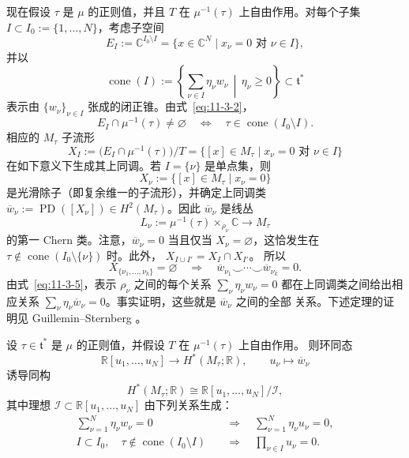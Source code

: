 现在假设 $\tau$ 是 $\mu$ 的正则值，并且 $T$ 在 $\mu^{-1}(\tau)$ 上自由作用。对每个子集
$I\subset I_0:=\{1,\ldots,N\}$，考虑子空间
\[
  E_I:=\mathbb C^{I_0\setminus I}
  =\{x\in\mathbb C^N\mid x_\nu=0\text{ 对 }\nu\in I\},
\]
并以
\[
  \operatorname{cone}(I):=
  \left\{\sum_{\nu\in I}\eta_\nu w_\nu\,\middle|\,
  \eta_\nu\geq0\right\}\subset\mathfrak t^*
\]
表示由 $\{w_\nu\}_{\nu\in I}$ 张成的闭正锥。由式~\eqref{eq:11-3-2}，
\begin{equation}\label{eq:11-3-3}
  E_I\cap\mu^{-1}(\tau)\ne\varnothing
  \quad\Longleftrightarrow\quad
  \tau\in\operatorname{cone}(I_0\setminus I).
\end{equation}
相应的 $M_\tau$ 子流形
\begin{equation}\label{eq:11-3-4}
  X_I:=\bigl(E_I\cap\mu^{-1}(\tau)\bigr)/T
  =\{[x]\in M_\tau\mid x_\nu=0\text{ 对 }\nu\in I\}
\end{equation}
在如下意义下生成其上同调。若 $I=\{\nu\}$ 是单点集，则
\[
  X_\nu:=\{[x]\in M_\tau\mid x_\nu=0\}
\]
是光滑除子（即复余维一的子流形），并确定上同调类
$\overline w_\nu:=\operatorname{PD}([X_\nu])\in H^2(M_\tau)$。因此
$\overline w_\nu$ 是线丛
\begin{equation}\label{eq:11-3-5}
  L_\nu:=\mu^{-1}(\tau)\times_{\rho_\nu}\mathbb C\longrightarrow M_\tau
\end{equation}
的第一 Chern 类。注意，$\overline w_\nu=0$ 当且仅当 $X_\nu=\varnothing$，这恰发生在
$\tau\notin\operatorname{cone}(I_0\setminus\{\nu\})$ 时。此外，
$X_{I\cup I'}=X_I\cap X_{I'}$。
所以
\[
  X_{\{\nu_1,\ldots,\nu_k\}}=\varnothing
  \quad\Longrightarrow\quad
  \overline w_{\nu_1}\smile\cdots\smile\overline w_{\nu_k}=0.
\]
由式~\eqref{eq:11-3-5}，表示 $\rho_\nu$ 之间的每个关系
$\sum_\nu\eta_\nu w_\nu=0$ 都在上同调类之间给出相应关系
$\sum_\nu\eta_\nu\overline w_\nu=0$。事实证明，这些就是 $\overline w_\nu$ 之间的全部
关系。下述定理的证明见 Guillemin--Sternberg 。

\begin{theorem}\label{thm:11-3-1}
设 $\tau\in\mathfrak t^*$ 是 $\mu$ 的正则值，并假设 $T$ 在 $\mu^{-1}(\tau)$ 上自由作用。
则环同态
\[
  \mathbb R[u_1,\ldots,u_N]\longrightarrow H^*(M_\tau;\mathbb R),
  \qquad u_\nu\longmapsto\overline w_\nu
\]
诱导同构
\[
  H^*(M_\tau;\mathbb R)\cong\mathbb R[u_1,\ldots,u_N]/\mathcal I,
\]
其中理想 $\mathcal I\subset\mathbb R[u_1,\ldots,u_N]$ 由下列关系生成：
\begin{align}
  \sum_{\nu=1}^N\eta_\nu w_\nu=0
  &\quad\Longrightarrow\quad
  \sum_{\nu=1}^N\eta_\nu u_\nu=0,
  \label{eq:11-3-6}\\
  I\subset I_0,\quad
  \tau\notin\operatorname{cone}(I_0\setminus I)
  &\quad\Longrightarrow\quad
  \prod_{\nu\in I}u_\nu=0.
  \label{eq:11-3-7}
\end{align}
\end{theorem}

